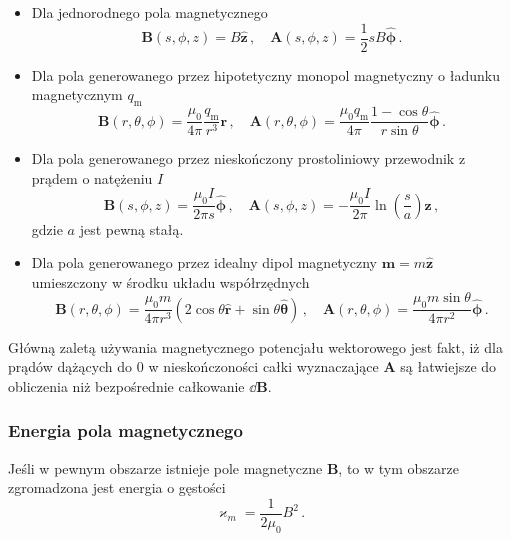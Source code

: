 \documentclass[../main.tex]{subfiles}
\begin{document}
\begin{itemize}
    \item Dla jednorodnego pola magnetycznego
\begin{equation*}
    \mathbf{B}(s,\phi,z)=B\mathbf{\hat{z}}\,,\quad \mathbf{A}(s,\phi,z)=\frac{1}{2}sB\boldsymbol{\hat{\phi}}\,.
\end{equation*}
    \item Dla pola generowanego przez hipotetyczny monopol magnetyczny o ładunku magnetycznym
    \(q_\text{m}\)
\begin{equation*}
    \mathbf{B}(r,\theta,\phi)=\frac{\mu_0}{4\pi}\frac{q_\text{m}}{r^3}\mathbf{r}\,,\quad     \mathbf{A}(r,\theta,\phi)=\frac{\mu_0q_\text{m}}{4\pi}\frac{1-\cos\theta}{r\sin\theta}\boldsymbol{\hat{\phi}}\,.
\end{equation*}
    \item Dla pola generowanego przez nieskończony prostoliniowy przewodnik z prądem o natężeniu
    \(I\)
    \begin{equation*}
        \mathbf{B}(s,\phi,z)=\frac{\mu_0I}{2\pi s}\boldsymbol{\hat{\phi}}\,,\quad \mathbf{A}(s,\phi,z)=-\frac{\mu_0I}{2\pi}\ln\left(\frac{s}{a}\right)\mathbf{\hat{z}}\,,
    \end{equation*}
    gdzie \(a\) jest pewną stałą.
    
    \item Dla pola generowanego przez idealny dipol magnetyczny \(\mathbf{m}=m\mathbf{\hat{z}}\)
    umieszczony w środku układu współrzędnych
    \begin{equation*}
        \mathbf{B}(r,\theta,\phi)=\frac{\mu_0m}{4\pi r^3}(2\cos\theta\mathbf{\hat{r}}+\sin\theta\boldsymbol{\hat{\theta}})\,,\quad \mathbf{A}(r,\theta,\phi)=\frac{\mu_0m\sin\theta}{4\pi r^2}\boldsymbol{\hat{\phi}}\,.
    \end{equation*}
\end{itemize}


Główną zaletą używania magnetycznego potencjału wektorowego jest fakt, iż dla prądów dążących do 0 w
nieskończoności całki wyznaczające \(\mathbf{A}\) są łatwiejsze do obliczenia niż bezpośrednie
całkowanie \(\dd{\mathbf{B}}\).
\subsubsection{Energia pola magnetycznego}
Jeśli w pewnym obszarze istnieje pole magnetyczne \(\mathbf{B}\), to w tym obszarze zgromadzona jest
energia o gęstości
\begin{equation*}
    \varkappa_m=\frac{1}{2\mu_0}B^2\,.
\end{equation*}
\end{document}

